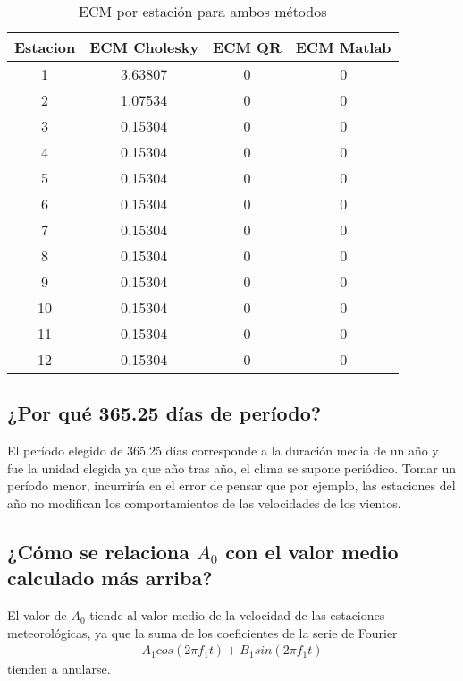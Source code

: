 \documentclass[]{article}
\begin{document}
\begin{table}[h!tbp]
    \centering
	\begin{tabular}{|c|c|c|c|}
		\hline 
		Estacion & ECM Cholesky & ECM QR & ECM Matlab\\
		\hline \hline
		1 & 3.63807 & 0 & 0 \\ \hline
		2 & 1.07534 & 0 & 0\\ \hline
		3 & 0.15304 & 0 & 0\\ \hline
		4 & 0.15304 & 0 & 0\\ \hline
		5 & 0.15304 & 0 & 0\\ \hline
		6 & 0.15304 & 0 & 0\\ \hline
		7 & 0.15304 & 0 & 0\\ \hline
		8 & 0.15304 & 0 & 0\\ \hline
		9 & 0.15304 & 0 & 0\\ \hline
		10 & 0.15304 & 0 & 0\\ \hline
		11 & 0.15304 & 0 & 0\\ \hline
		12 & 0.15304 & 0 & 0\\ \hline
		
	\end{tabular}
	\caption{ECM por estación para ambos métodos}
	\label{table:}
\end{table}

\subsection{¿Por qué 365.25 días de período?}
\par 
El período elegido de 365.25 días corresponde a la duración media de un año y fue la unidad elegida ya que año tras año, el clima se supone periódico. Tomar un período menor, incurriría en el error de pensar que por ejemplo, las estaciones del año no modifican los comportamientos de las velocidades de los vientos.

\subsection{¿Cómo se relaciona $A_0$ con el valor medio calculado más arriba?}
\par
El valor de $A_0$  tiende al valor medio de la velocidad de las estaciones meteorológicas, ya que la suma de los coeficientes de la serie de Fourier 
\begin{eqnarray}
	A_1 cos(2 \pi f_1 t) + B_1 sin(2 \pi f_1 t)
\end{eqnarray}
tienden a anularse.
\end{document}
